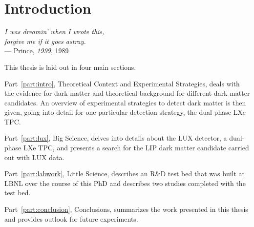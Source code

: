 \chapter{Introduction}\label{ch:introduction} %

\begin{flushright}{\slshape    
    I was dreamin' when I wrote this, \\
    forgive me if it goes astray. } \\ \medskip
    --- {Prince, \textit{1999}, 1989}
\end{flushright}

This thesis is laid out in four main sections. 

Part~\ref{part:intro}, Theoretical Context and Experimental Strategies, deals with the evidence for dark matter and theoretical background for different dark matter candidates. An overview of experimental strategies to detect dark matter is then given, going into detail for one particular detection strategy, the dual-phase \ac{LXe} \ac{TPC}.

Part~\ref{part:lux}, Big Science, delves into details about the \ac{LUX} detector, a dual-phase \ac{LXe} \ac{TPC}, and presents a search for the \ac{LIP} dark matter candidate carried out with \ac{LUX} data.

Part~\ref{part:labwork}, Little Science, describes an R\&D test bed that was built at \ac{LBNL} over the course of this PhD and describes two studies completed with the test bed. 

Part~\ref{part:conclusion}, Conclusions, summarizes the work presented in this thesis and provides outlook for future experiments.


